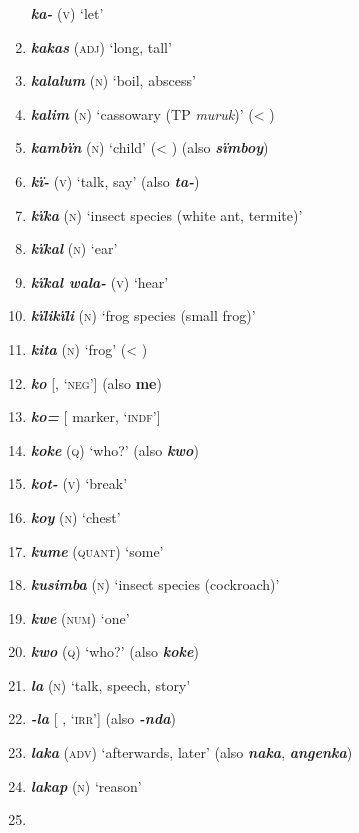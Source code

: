 \begin{enumerate}[noitemsep, label={}, align=left, widest=190, labelsep=1ex,leftmargin=*,itemindent=-10pt]
\textbf{\textit{ka-}} (\textsc{v)} ‘let’ \item
\textbf{\textit{kakas}} (\textsc{adj)} ‘long, tall’ \item
\textbf{\textit{kalalum}} (\textsc{n)} ‘boil, abscess’ \item
\textbf{\textit{kalim}} (\textsc{n)} ‘cassowary (TP \textit{muruk})’ (< ) \item
\textbf{\textit{kambïn}} (\textsc{n)} ‘child’ (< ) (also \textbf{\textit{sïmboy}}) \item
\textbf{\textit{kï-}} (\textsc{v)} ‘talk, say’ (also \textbf{\textit{ta-}}) \item
\textbf{\textit{kïka}} (\textsc{n)} ‘insect species (white ant, termite)’ \item
\textbf{\textit{kïkal}} (\textsc{n)} ‘ear’ \item
\textbf{\textit{kïkal wala-}} (\textsc{v)} ‘hear’ \item
\textbf{\textit{kïlikïli}} (\textsc{n)} ‘frog species (small frog)’ \item
\textbf{\textit{kita}} (\textsc{n)} ‘frog’ (< ) \item
\textbf{\textit{ko}} [, ‘\textsc{neg}’] (also \textbf{me}) \item
\textbf{\textit{ko=}} [ marker, ‘\textsc{indf}’] \item
\textbf{\textit{koke}} (\textsc{q)} ‘who?’ (also \textbf{\textit{kwo}}) \item
\textbf{\textit{kot-}} (\textsc{v)} ‘break’ \item
\textbf{\textit{koy}} (\textsc{n)} ‘chest’ \item
\textbf{\textit{kume}} (\textsc{quant)} ‘some’ \item
\textbf{\textit{kusimba}} (\textsc{n)} ‘insect species (cockroach)’ \item
\textbf{\textit{kwe}} (\textsc{num)} ‘one’ \item
\textbf{\textit{kwo}} (\textsc{q)} ‘who?’ (also \textbf{\textit{koke}}) \item
\textbf{\textit{la}} (\textsc{n)} ‘talk, speech, story’ \item
\textbf{\textit{-la}} [ , ‘\textsc{irr}’] (also \textbf{\textit{-nda}}) \item
\textbf{\textit{laka}} (\textsc{adv)} ‘afterwards, later’ (also \textbf{\textit{naka}}, \textbf{\textit{angenka}}) \item
\textbf{\textit{lakap}} (\textsc{n)} ‘reason’ \item

\end{enumerate}
